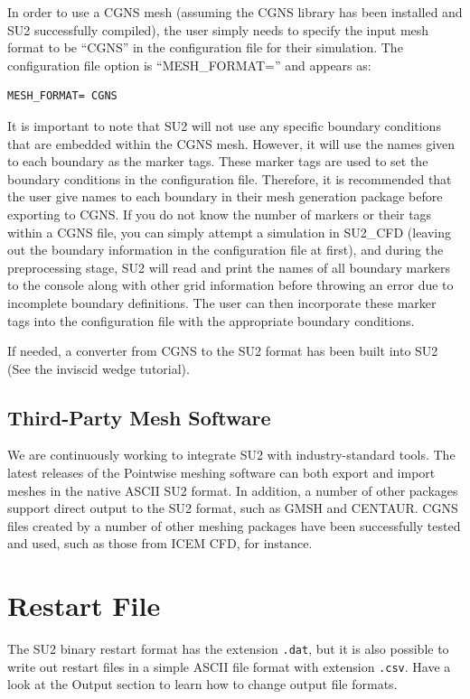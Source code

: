 \documentclass[12pt, a4paper, twoside]{article}
\begin{document}
In order to use a CGNS mesh (assuming the CGNS library has been installed and SU2 successfully compiled), the user simply needs to specify the input mesh format to be “CGNS” in the configuration file for their simulation. The configuration file option is “MESH\_FORMAT=” and appears as:

\begin{lstlisting}
MESH_FORMAT= CGNS
\end{lstlisting}


It is important to note that SU2 will not use any specific boundary conditions that are embedded within the CGNS mesh. However, it will use the names given to each boundary as the marker tags. These marker tags are used to set the boundary conditions in the configuration file. Therefore, it is recommended that the user give names to each boundary in their mesh generation package before exporting to CGNS. If you do not know the number of markers or their tags within a CGNS file, you can simply attempt a simulation in SU2\_CFD (leaving out the boundary information in the configuration file at first), and during the preprocessing stage, SU2 will read and print the names of all boundary markers to the console along with other grid information before throwing an error due to incomplete boundary definitions. The user can then incorporate these marker tags into the configuration file with the appropriate boundary conditions.

If needed, a converter from CGNS to the SU2 format has been built into SU2 (See the inviscid wedge tutorial).

\subsection{Third-Party Mesh Software}


We are continuously working to integrate SU2 with industry-standard tools. The latest releases of the Pointwise meshing software can both export and import meshes in the native ASCII SU2 format. In addition, a number of other packages support direct output to the SU2 format, such as GMSH and CENTAUR. CGNS files created by a number of other meshing packages have been successfully tested and used, such as those from ICEM CFD, for instance.

\newpage

\section{Restart File}
The SU2 binary restart format has the extension \verb|.dat|, but it is also possible to write out restart files in a simple ASCII file format with extension \verb|.csv|. Have a look at the Output section to learn how to change output file formats.
\end{document}
